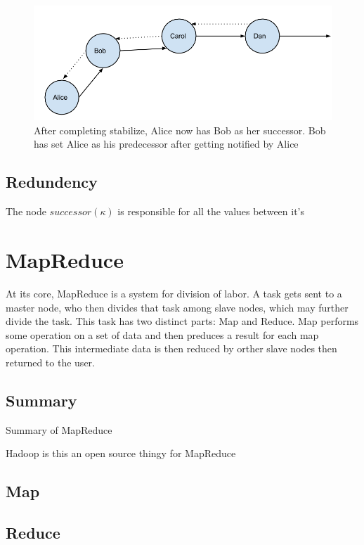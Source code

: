 \documentclass[conference, compsocconf, letterpaper]{IEEEtran}
\begin{document}
\begin{figure}
    \includegraphics[width=\linewidth]{abcd2}
    \caption{After completing stabilize, Alice now has Bob as her successor. Bob has set Alice as his predecessor after getting notified by Alice}
    \label{abcd2}
\end{figure}



\subsection{Redundency}
The node $successor(\kappa)$ is responsible for all the values between it's  
\section{MapReduce}
At its core, MapReduce \cite{mapreduce} is a system for division of labor.  A task gets sent to a master node, who then divides that task among slave nodes, which may further divide the task.  This task has two distinct parts: Map and Reduce.  Map performs some operation on a set of data and then preduces a result for each map operation.  This intermediate data is then reduced by orther slave nodes then returned to the user. 

\subsection{Summary}

Summary of MapReduce \cite{mapreduce} 

Hadoop is this an open source thingy for MapReduce \cite{hadoop}

\subsection{Map}
\subsection{Reduce}
\end{document}
